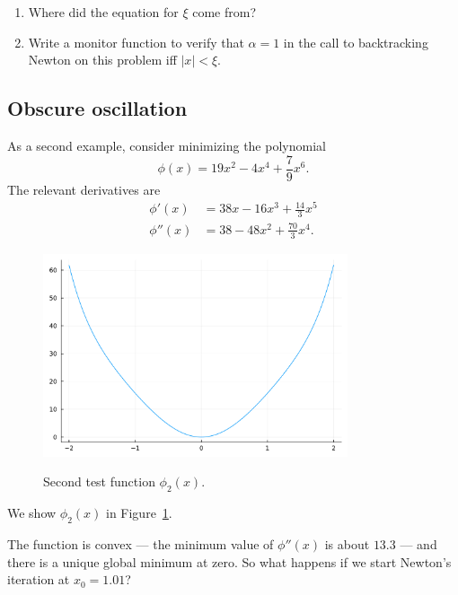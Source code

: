 \documentclass[12pt, leqno]{article} %
\providecommand{\tightlist}{%
  \setlength{\itemsep}{0pt}\setlength{\parskip}{0pt}}
\begin{document}
\begin{enumerate}
\def\labelenumi{\arabic{enumi}.}
\tightlist
\item
  Where did the equation for \(\xi\) come from?
\item
  Write a monitor function to verify that \(\alpha = 1\) in the call to
  backtracking Newton on this problem iff \(|x| < \xi\).
\end{enumerate}

\subsection{Obscure oscillation}

As a second example, consider minimizing the polynomial
\[\phi(x) = 19x^2 - 4x^4 + \frac{7}{9} x^6.\] The relevant derivatives
are \begin{align*}
  \phi'(x) &= 38x - 16x^3 + \frac{14}{3} x^5 \\
  \phi''(x) &= 38 - 48x^2 + \frac{70}{3} x^4.
\end{align*}

\begin{figure}
\begin{center}
  \includegraphics[width=0.8\textwidth]{fig/2023-04-17-phi2.pdf} \\
\end{center}
\caption{Second test function $\phi_2(x)$.}
\label{fig:phi2}
\end{figure}
We show $\phi_2(x)$ in Figure~\ref{fig:phi2}.

The function is convex --- the minimum value of \(\phi''(x)\) is about
\(13.3\) --- and there is a unique global minimum at zero. So what
happens if we start Newton's iteration at \(x_0 = 1.01\)?
\end{document}
